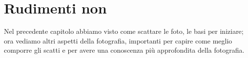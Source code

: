 \chapter{Rudimenti non} \label{ch:rudimenti_non}

Nel precedente capitolo abbiamo visto come scattare le foto, le basi per iniziare; ora vediamo altri aspetti della fotografia, importanti per capire come meglio comporre gli scatti e per avere una conoscenza più approfondita della fotografia.

\pagebreak